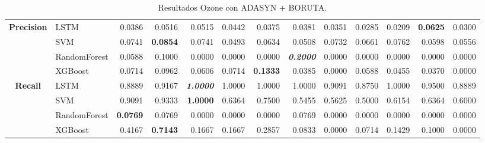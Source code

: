 \begin{table}[H]
\begin{adjustbox}{max width=14cm}
\begin{tabular}{|c|l|r|r|r|r|r|r|r|r|r|r|r|}
			\hline
			\textbf{Precision} &  LSTM &  0.0386 &  0.0516 &  0.0515 &  0.0442 &  0.0375 &  0.0381 &  0.0351 &  0.0285 &  0.0209 & \textbf{  0.0625 } &  0.0300 \\
			&  SVM &  0.0741 & \textbf{  0.0854 } &  0.0741 &  0.0493 &  0.0634 &  0.0508 &  0.0732 &  0.0661 &  0.0762 &  0.0598 &  0.0556 \\
			&  RandomForest &  0.0588 &  0.1000 &  0.0000 &  0.0000 &  0.0000 & \textit{ \textbf{  0.2000 } } &  0.0000 &  0.0000 &  0.0000 &  0.0000 &  0.0000 \\
			&  XGBoost &  0.0714 &  0.0962 &  0.0606 &  0.0714 & \textbf{  0.1333 } &  0.0385 &  0.0000 &  0.0588 &  0.0455 &  0.0370 &  0.0000 \\
			\hline
			\textbf{Recall} &  LSTM &  0.8889 &  0.9167 & \textit{ \textbf{  1.0000 } } &  1.0000 &  1.0000 &  1.0000 &  0.9091 &  0.8750 &  1.0000 &  0.9500 &  0.8889 \\
			&  SVM &  0.9091 &  0.9333 & \textbf{  1.0000 } &  0.6364 &  0.7500 &  0.5455 &  0.5625 &  0.5000 &  0.6154 &  0.6364 &  0.6000 \\
			&  RandomForest & \textbf{  0.0769 } &  0.0769 &  0.0000 &  0.0000 &  0.0000 &  0.0769 &  0.0000 &  0.0000 &  0.0000 &  0.0000 &  0.0000 \\
			&  XGBoost &  0.4167 & \textbf{  0.7143 } &  0.1667 &  0.1667 &  0.2857 &  0.0833 &  0.0000 &  0.0714 &  0.1429 &  0.1000 &  0.0000 \\
			\hline
		\end{tabular}
	\end{adjustbox}
	\caption{Resultados Ozone con ADASYN + BORUTA.}
	\label{tab:Ozone_ADASYN_BORUTA}
\end{table}

